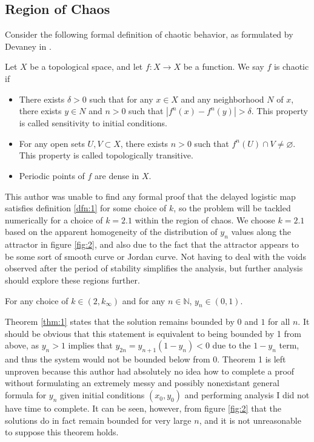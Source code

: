 \documentclass[11pt, letterpaper]{article}
\begin{document}
\subsection{Region of Chaos}
Consider the following formal definition of chaotic behavior, as formulated by Devaney in \cite{devaney}.
\begin{definition}\label{dfn:1}
	Let $X$ be a topological space, and let $f : X \to X$ be a function. We say $f$ is chaotic if
	\begin{itemize}
		\item There exists $\delta >0$ such that for any $x\in X$ and any neighborhood $N$ of $x$, there exists $y\in N$ and $n>0$ such that $\left| f^n(x)-f^n(y) \right| >\delta $. This property is called sensitivity to initial conditions.
		\item For any open sets $U,V\subset X$, there exists $n>0$ such that $f^n(U)\cap V\neq \varnothing$. This property is called topologically transitive.
		\item Periodic points of $f$ are dense in $X$.
	\end{itemize}
\end{definition}
This author was unable to find any formal proof that the delayed logistic map satisfies definition \ref{dfn:1} for some choice of $k$, so the problem will be tackled numerically for a choice of $k=2.1$ within the region of chaos. We choose $k=2.1$ based on the apparent homogeneity of the distribution of $y_n$ values along the attractor in figure \ref{fig:2}, and also due to the fact that the attractor  appears to be some sort of smooth curve or Jordan curve. Not having to deal with the voids observed after the period of stability simplifies the analysis, but further analysis should explore these regions further.

\begin{theorem}\label{thm:1}
	For any choice of $k\in (2,k_\infty)$ and for any $n\in\mathbb{N}$, $y_n\in (0,1)$.
\end{theorem}

Theorem \ref{thm:1} states that the solution remains bounded by $0$ and $1$ for all $n$. It should be obvious that this statement is equivalent to being bounded by 1 from above, as $y_n>1$ implies that $y_{2n}=y_{n+1}(1-y_n)<0$ due to the $1-y_n$ term, and thus the system would not be bounded below from 0. Theorem 1 is left unproven because this author had absolutely no idea how to complete a proof without formulating an extremely messy and possibly nonexistant general formula for $y_n$ given initial conditions $(x_0,y_0)$ and performing analysis I did not have time to complete. It can be seen, however, from figure \ref{fig:2} that the solutions do in fact remain bounded for very large $n$, and it is not unreasonable to suppose this theorem holds.
\end{document}
